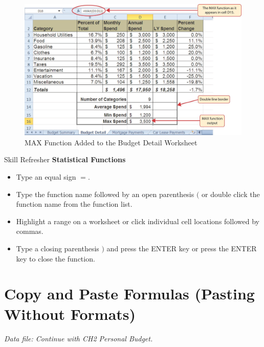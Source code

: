 \begin{figure}[H]
	\centering
	\includegraphics[width=\maxwidth{.95\linewidth}]{gfx/ch02_fig25}
	\caption{MAX Function Added to the Budget Detail Worksheet}
	\label{02:fig25}
\end{figure}

\begin{center}
	\begin{sklbox}{Skill Refresher}
		\textbf{Statistical Functions}
		\\
		\begin{itemize}
			\setlength{\itemsep}{0pt}
			\setlength{\parskip}{0pt}
			\setlength{\parsep}{0pt}

			\item Type an equal sign $ = $.
			\item Type the function name followed by an open parenthesis $ ( $ or double click the function name from the function list.
			\item Highlight a range on a worksheet or click individual cell locations followed by commas.
			\item Type a closing parenthesis $ ) $ and press the ENTER key or press the ENTER key to close the function.
			
		\end{itemize}
	\end{sklbox}
\end{center}

\section{Copy and Paste Formulas (Pasting Without Formats)}

\textit{Data file: Continue with CH2 Personal Budget.}

